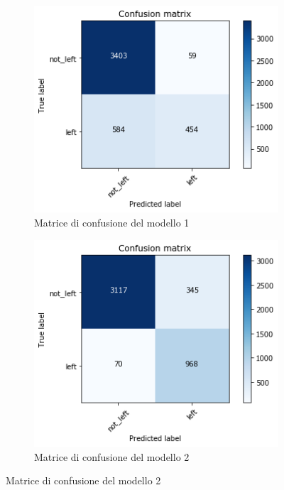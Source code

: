 \documentclass[a4paper]{article}
\begin{document}
\begin{figure}[h]
\centering
\begin{subfigure}[b]{.45\linewidth}
\includegraphics[width=\linewidth]{modello1Conf}
\caption{Matrice di confusione del modello 1}\label{subfig:conf1}
\end{subfigure}
\begin{subfigure}[b]{.45\linewidth}
\includegraphics[width=\linewidth]{modello2Conf}
\caption{Matrice di confusione del modello 2}\label{subfig:conf2}
\end{subfigure}

\end{figure}
\end{document}
